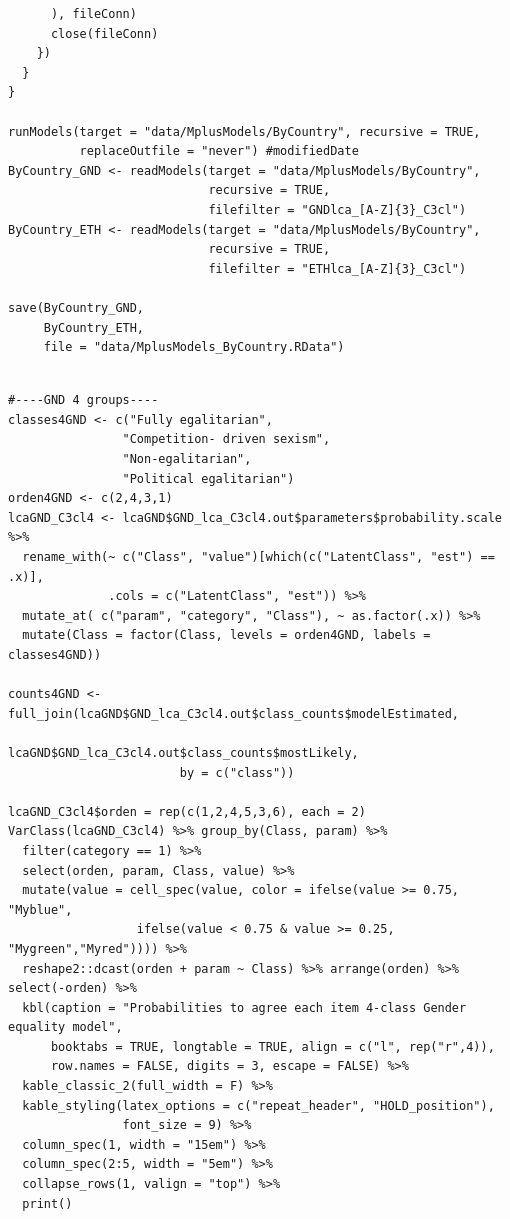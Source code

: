 \documentclass[12pt,a4paper,oneside]{reedthesis}
\begin{document}
\begin{verbatim}
      ), fileConn)
      close(fileConn)
    })
  }
}

runModels(target = "data/MplusModels/ByCountry", recursive = TRUE, 
          replaceOutfile = "never") #modifiedDate
ByCountry_GND <- readModels(target = "data/MplusModels/ByCountry", 
                            recursive = TRUE, 
                            filefilter = "GNDlca_[A-Z]{3}_C3cl")
ByCountry_ETH <- readModels(target = "data/MplusModels/ByCountry", 
                            recursive = TRUE, 
                            filefilter = "ETHlca_[A-Z]{3}_C3cl")

save(ByCountry_GND,
     ByCountry_ETH,
     file = "data/MplusModels_ByCountry.RData")
 
\end{verbatim}
\begin{verbatim}
#----GND 4 groups----
classes4GND <- c("Fully egalitarian",
                "Competition- driven sexism",
                "Non-egalitarian",
                "Political egalitarian")
orden4GND <- c(2,4,3,1)
lcaGND_C3cl4 <- lcaGND$GND_lca_C3cl4.out$parameters$probability.scale %>% 
  rename_with(~ c("Class", "value")[which(c("LatentClass", "est") == .x)], 
              .cols = c("LatentClass", "est")) %>% 
  mutate_at( c("param", "category", "Class"), ~ as.factor(.x)) %>% 
  mutate(Class = factor(Class, levels = orden4GND, labels = classes4GND))

counts4GND <- full_join(lcaGND$GND_lca_C3cl4.out$class_counts$modelEstimated,
                        lcaGND$GND_lca_C3cl4.out$class_counts$mostLikely,
                        by = c("class"))

lcaGND_C3cl4$orden = rep(c(1,2,4,5,3,6), each = 2) 
VarClass(lcaGND_C3cl4) %>% group_by(Class, param) %>% 
  filter(category == 1) %>% 
  select(orden, param, Class, value) %>% 
  mutate(value = cell_spec(value, color = ifelse(value >= 0.75, "Myblue", 
                  ifelse(value < 0.75 & value >= 0.25, "Mygreen","Myred")))) %>% 
  reshape2::dcast(orden + param ~ Class) %>% arrange(orden) %>% select(-orden) %>% 
  kbl(caption = "Probabilities to agree each item 4-class Gender equality model",
      booktabs = TRUE, longtable = TRUE, align = c("l", rep("r",4)), 
      row.names = FALSE, digits = 3, escape = FALSE) %>%
  kable_classic_2(full_width = F) %>% 
  kable_styling(latex_options = c("repeat_header", "HOLD_position"), 
                font_size = 9) %>% 
  column_spec(1, width = "15em") %>%  
  column_spec(2:5, width = "5em") %>%  
  collapse_rows(1, valign = "top") %>% 
  print()


\end{verbatim}
\end{document}
